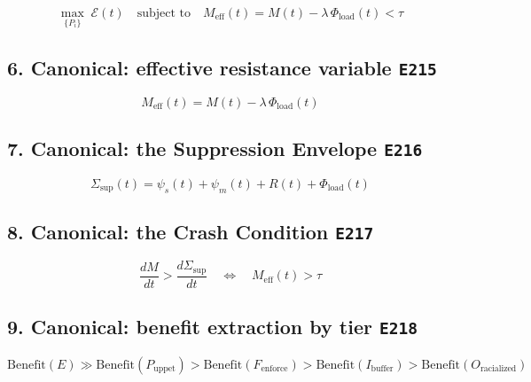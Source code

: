 \documentclass[11pt]{article}
\begin{document}
\begin{equation}\label{eq:19.1-kernel-objective-registry-entry}
\max_{\{P_i\}}\; \mathcal{E}(t) \quad \text{subject to} \quad M_{\text{eff}}(t) = M(t) - \lambda\,\Phi_{\text{load}}(t) < \tau
\end{equation}

\subsection*{6. Canonical: effective resistance variable \hfill \texttt{E215}}

\begin{equation}\label{eq:19.1a-effective-resistance-registry-entry}
M_{\text{eff}}(t) = M(t) - \lambda\,\Phi_{\text{load}}(t)
\end{equation}

\subsection*{7. Canonical: the Suppression Envelope \hfill \texttt{E216}}

\begin{equation}\label{eq:19.2-suppression-envelope-registry-entry}
\Sigma_{\text{sup}}(t) = \psi_s(t) + \psi_m(t) + R(t) + \Phi_{\text{load}}(t)
\end{equation}

\subsection*{8. Canonical: the Crash Condition \hfill \texttt{E217}}

\begin{equation}\label{eq:19.3-crash-condition-registry-entry}
\frac{dM}{dt} > \frac{d\Sigma_{\text{sup}}}{dt} \quad \Longleftrightarrow \quad M_{\text{eff}}(t) > \tau
\end{equation}

\subsection*{9. Canonical: benefit extraction by tier \hfill \texttt{E218}}

\begin{equation}\label{eq:19.4-tier-ordering-registry-entry}
\text{Benefit}(E) \gg \text{Benefit}(P_{\text{uppet}}) > \text{Benefit}(F_{\text{enforce}}) > \text{Benefit}(I_{\text{buffer}}) > \text{Benefit}(O_{\text{racialized}})
\end{equation}
\end{document}
